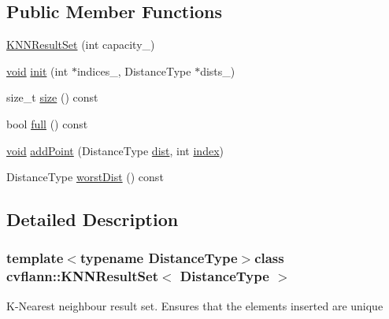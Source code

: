\subsection*{Public Member Functions}
\begin{DoxyCompactItemize}
\item 
\hyperlink{classcvflann_1_1KNNResultSet_aed8fc59bf2fec164a47e2fabf63dc281}{K\-N\-N\-Result\-Set} (int capacity\-\_\-)
\item 
\hyperlink{legacy_8hpp_a8bb47f092d473522721002c86c13b94e}{void} \hyperlink{classcvflann_1_1KNNResultSet_ae9eab3480d859a6bc93d3c8ca963b41b}{init} (int $\ast$indices\-\_\-, Distance\-Type $\ast$dists\-\_\-)
\item 
size\-\_\-t \hyperlink{classcvflann_1_1KNNResultSet_ae5eb6c6791ff2dbc4db29aded5bd8195}{size} () const 
\item 
bool \hyperlink{classcvflann_1_1KNNResultSet_acd2c32a6aeb78a2ba1d1f63201a8fb7c}{full} () const 
\item 
\hyperlink{legacy_8hpp_a8bb47f092d473522721002c86c13b94e}{void} \hyperlink{classcvflann_1_1KNNResultSet_aa937f5fcd5e697de077f92d081c73e11}{add\-Point} (Distance\-Type \hyperlink{legacy_8hpp_ae895c2003a87eda49126845b7ac3688e}{dist}, int \hyperlink{core__c_8h_a750b5d744c39a06bfb13e6eb010e35d0}{index})
\item 
Distance\-Type \hyperlink{classcvflann_1_1KNNResultSet_abdeef6c6419cd4a0f3ccd5a67e3d0c38}{worst\-Dist} () const 
\end{DoxyCompactItemize}


\subsection{Detailed Description}
\subsubsection*{template$<$typename Distance\-Type$>$class cvflann\-::\-K\-N\-N\-Result\-Set$<$ Distance\-Type $>$}

K-\/\-Nearest neighbour result set. Ensures that the elements inserted are unique 

